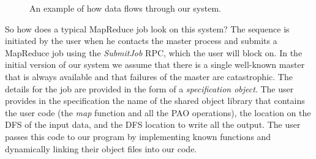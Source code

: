 \documentclass[10pt,letter,final,article,twocolumn]{article} %
\newcommand{\rpc}[1]{\emph{#1}}
\begin{document}
\begin{figure}[htbp]
\begin{center}
\caption{An example of how data flows through our system.}
\label{fig:flow}
\end{center}
\end{figure}

So how does a typical MapReduce job look on this system? The sequence is initiated by the user when he contacts the master process and submits a MapReduce job using the \rpc{SubmitJob} RPC, which the user will block on.  In the initial version of our system we assume that there is a single well-known master that is always available and that failures of the master are catastrophic. The details for the job are provided in the form of a \emph{specification object}. The user provides in the specification the name of the shared object library that contains the user code (the \emph{map} function and all the PAO operations), the location on the DFS of the input data, and the DFS location to write all the output. The user passes this code to our program by implementing known functions and dynamically linking their object files into our code.
\end{document}

